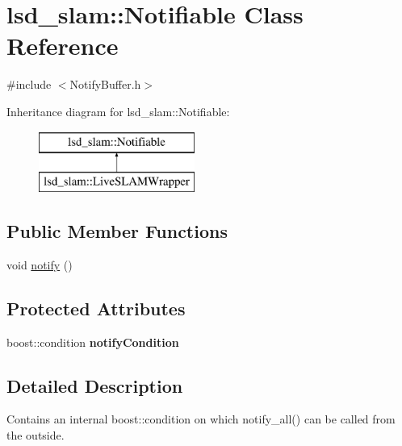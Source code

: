 \hypertarget{classlsd__slam_1_1_notifiable}{\section{lsd\-\_\-slam\-:\-:Notifiable Class Reference}
\label{classlsd__slam_1_1_notifiable}
}


{\ttfamily \#include $<$Notify\-Buffer.\-h$>$}

Inheritance diagram for lsd\-\_\-slam\-:\-:Notifiable\-:\begin{figure}[H]
\begin{center}
\leavevmode
\includegraphics[height=2.000000cm]{classlsd__slam_1_1_notifiable}
\end{center}
\end{figure}
\subsection*{Public Member Functions}
\begin{DoxyCompactItemize}
\item 
void \hyperlink{classlsd__slam_1_1_notifiable_a57feb058f865c0e693ca3806416d84ac}{notify} ()
\end{DoxyCompactItemize}
\subsection*{Protected Attributes}
\begin{DoxyCompactItemize}
\item 
\hypertarget{classlsd__slam_1_1_notifiable_a0b321c3c5b0db6ab8bb689c821384246}{boost\-::condition {\bfseries notify\-Condition}}\label{classlsd__slam_1_1_notifiable_a0b321c3c5b0db6ab8bb689c821384246}

\end{DoxyCompactItemize}


\subsection{Detailed Description}
Contains an internal boost\-::condition on which notify\-\_\-all() can be called from the outside. 

